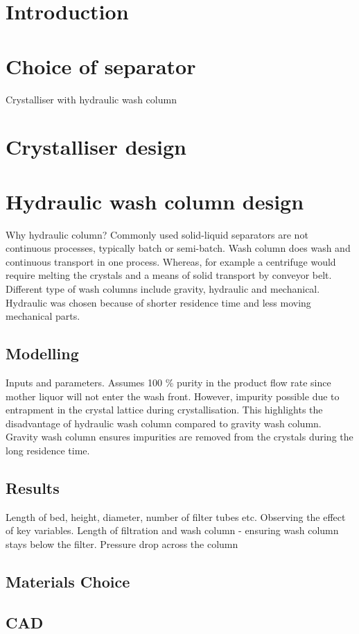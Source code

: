 \section{Introduction}


\section{Choice of separator}
Crystalliser with hydraulic wash column 



\section{Crystalliser design}




\section{Hydraulic wash column design}
Why hydraulic column?
Commonly used solid-liquid separators are not continuous processes, typically batch or semi-batch. Wash column does wash and continuous transport in one process. Whereas, for example a centrifuge would require  melting the crystals and a means of solid transport by conveyor belt. Different type of wash columns include gravity, hydraulic and mechanical. Hydraulic was chosen because of shorter residence time and less moving mechanical parts. 

\subsection{Modelling}
Inputs and parameters. 
Assumes 100 \% purity in the product flow rate since mother liquor will not enter the wash front. However, impurity  possible due to entrapment in the crystal lattice during crystallisation. This highlights the disadvantage of hydraulic wash column compared to gravity wash column. Gravity wash column ensures impurities are removed from the crystals during the long residence time. 


\subsection{Results}
Length of bed, height, diameter, number of filter tubes etc. Observing the effect of key variables. Length of filtration and wash column - ensuring wash column stays below the filter. Pressure drop across the column

\subsection{Materials Choice}

\subsection{CAD}

